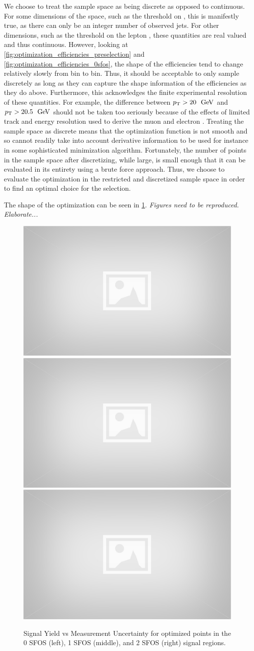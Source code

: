 We choose to treat the sample space as being discrete as opposed
to continuous. For some dimensions of the space, such as 
the threshold on \njet, this is manifestly true, as there 
can only be an integer number of observed jets. 
For other dimensions, such as the threshold on the lepton
\pt, these quantities are real valued and thus continuous.
However, looking at \fig\ref{fig:optimization_efficiencies_preselection} 
and \fig\ref{fig:optimization_efficiencies_0sfos}, the shape
of the efficiencies tend to change relatively slowly from bin
to bin. Thus, it should be acceptable to only sample 
discretely as long as they can capture the shape information of 
the efficiencies as they do above. Furthermore, 
this acknowledges the finite  experimental resolution of these 
quantities. For example,
the difference between $\pt > 20~\GeV$ and $\pt > 20.5~\GeV$
should not be taken too seriously because of the effects of limited
track and energy resolution used to derive the muon and electron \pt.
Treating the sample space as discrete means that the optimization
function is not smooth and so cannot readily take into account
derivative information to be used for instance 
in some sophisticated minimization algorithm.
Fortunately, the number of points in the sample space after discretizing, 
while large, is small enough that it can be evaluated in its entirety
using a brute force approach. Thus, we choose to evaluate the 
optimization in the restricted and discretized sample space in order
to find an optimal choice for the selection.


The shape of the optimization can be seen in \fig\ref{fig:optimization}.
\emph{Figures need to be reproduced. Elaborate...} 


\begin{figure}[ht!]
\centering
\includegraphics[width=0.3\columnwidth]{figures/placeholder.eps}
\includegraphics[width=0.3\columnwidth]{figures/placeholder.eps}
\includegraphics[width=0.3\columnwidth]{figures/placeholder.eps}
\caption{Signal Yield vs Measurement Uncertainty for optimized points 
in the 0 SFOS (left), 1 SFOS (middle), and 2 SFOS (right) signal regions.}
\label{fig:optimization}
\end{figure}

